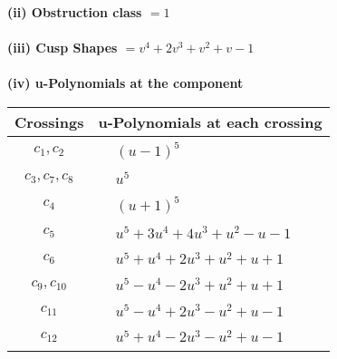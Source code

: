 \documentclass[1p]{elsarticle_modified}
\theoremstyle{definition}
\begin{document}
\flushleft \textbf{(ii) Obstruction class $= 1$}\\~\\
\flushleft \textbf{(iii) Cusp Shapes $= v^4+2 v^3+v^2+v-1$}\\~\\
\newpage\renewcommand{\arraystretch}{1}
\flushleft \textbf{(iv) u-Polynomials at the component}\newline \\
\begin{tabular}{m{50pt}|m{274pt}}
Crossings & \hspace{64pt}u-Polynomials at each crossing \\
\hline $$\begin{aligned}c_{1},c_{2}\end{aligned}$$&$\begin{aligned}
&(u-1)^5
\end{aligned}$\\
\hline $$\begin{aligned}c_{3},c_{7},c_{8}\end{aligned}$$&$\begin{aligned}
&u^5
\end{aligned}$\\
\hline $$\begin{aligned}c_{4}\end{aligned}$$&$\begin{aligned}
&(u+1)^5
\end{aligned}$\\
\hline $$\begin{aligned}c_{5}\end{aligned}$$&$\begin{aligned}
&u^5+3 u^4+4 u^3+u^2- u-1
\end{aligned}$\\
\hline $$\begin{aligned}c_{6}\end{aligned}$$&$\begin{aligned}
&u^5+u^4+2 u^3+u^2+u+1
\end{aligned}$\\
\hline $$\begin{aligned}c_{9},c_{10}\end{aligned}$$&$\begin{aligned}
&u^5- u^4-2 u^3+u^2+u+1
\end{aligned}$\\
\hline $$\begin{aligned}c_{11}\end{aligned}$$&$\begin{aligned}
&u^5- u^4+2 u^3- u^2+u-1
\end{aligned}$\\
\hline $$\begin{aligned}c_{12}\end{aligned}$$&$\begin{aligned}
&u^5+u^4-2 u^3- u^2+u-1
\end{aligned}$\\
\hline
\end{tabular}\\~\\
\end{document}
